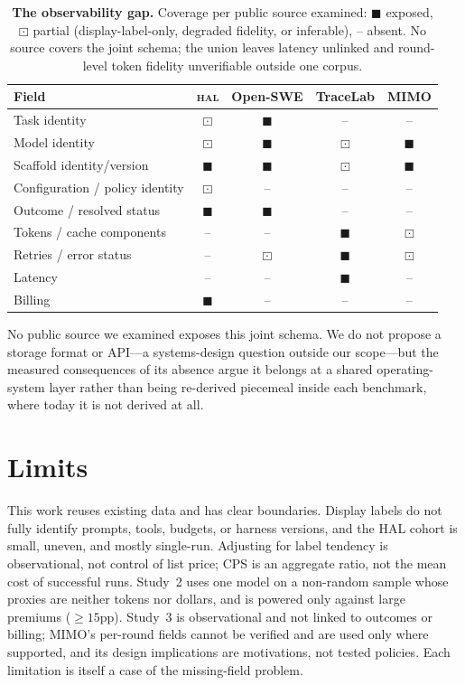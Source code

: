 \documentclass{article}
\newcommand{\hal}{\textsc{hal}}
\newcommand{\fYes}{$\blacksquare$}
\newcommand{\fPart}{$\boxdot$}
\newcommand{\fNo}{--}
\begin{document}
\begin{table}[t]
\centering
\caption{\textbf{The observability gap.} Coverage per public source examined: {\fYes} exposed, {\fPart} partial (display-label-only, degraded fidelity, or inferable), {\fNo} absent. No source covers the joint schema; the union leaves latency unlinked and round-level token fidelity unverifiable outside one corpus.}
\label{tab:gap}
\footnotesize
\setlength{\tabcolsep}{4pt}
\begin{tabular}{lcccc}
\toprule
Field & \hal{} & Open-SWE & TraceLab & MIMO \\
\midrule
Task identity & \fPart & \fYes & \fNo & \fNo \\
Model identity & \fPart & \fYes & \fPart & \fYes \\
Scaffold identity/version & \fYes & \fYes & \fPart & \fYes \\
Configuration / policy identity & \fPart & \fNo & \fNo & \fNo \\
Outcome / resolved status & \fYes & \fYes & \fNo & \fNo \\
Tokens / cache components & \fNo & \fNo & \fYes & \fPart \\
Retries / error status & \fNo & \fPart & \fYes & \fPart \\
Latency & \fNo & \fNo & \fYes & \fNo \\
Billing & \fYes & \fNo & \fNo & \fNo \\
\bottomrule
\end{tabular}
\end{table}

No public source we examined exposes this joint schema. We do not propose a storage format or API---a systems-design question outside our scope---but the measured consequences of its absence argue it belongs at a shared operating-system layer rather than being re-derived piecemeal inside each benchmark, where today it is not derived at all.

\section{Limits}
\label{sec:limits}

This work reuses existing data and has clear boundaries. Display labels do not fully identify prompts, tools, budgets, or harness versions, and the HAL cohort is small, uneven, and mostly single-run. Adjusting for label tendency is observational, not control of list price; CPS is an aggregate ratio, not the mean cost of successful runs. Study~2 uses one model on a non-random sample whose proxies are neither tokens nor dollars, and is powered only against large premiums ($\geq 15$pp). Study~3 is observational and not linked to outcomes or billing; MIMO's per-round fields cannot be verified and are used only where supported, and its design implications are motivations, not tested policies. Each limitation is itself a case of the missing-field problem.
\end{document}
